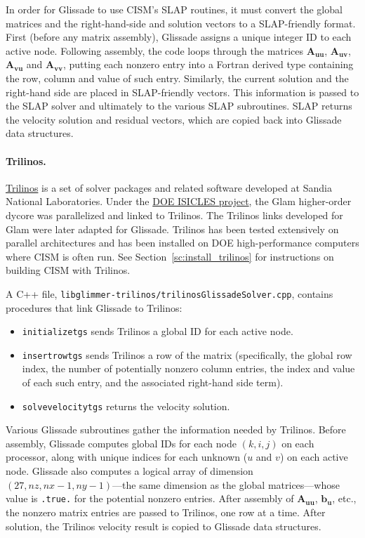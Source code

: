 {In order for Glissade to use CISM's SLAP routines, it must convert the global matrices and the 
right-hand-side and solution vectors to a SLAP-friendly format. First (before any matrix assembly),
Glissade assigns a unique integer ID to each active node.  Following assembly, the code loops through the matrices
$\mathbf{A_{uu}}$, $\mathbf{A_{uv}}$, $\mathbf{A_{vu}}$ and $\mathbf{A_{vv}}$, putting each nonzero entry into a Fortran derived type containing
the row, column and value of such entry.  Similarly, the current solution and the right-hand side are placed
in SLAP-friendly vectors. This information is passed to the SLAP solver
and ultimately to the various SLAP subroutines.  SLAP returns the velocity solution
and residual vectors, which are copied back into Glissade data structures.

\paragraph{Trilinos.}

\href{http://trilinos.org}{Trilinos} is a set of solver packages and related software developed at 
Sandia National Laboratories. Under the 
\href{http://www.csm.ornl.gov/ISICLES/}{DOE ISICLES project},
the Glam higher-order dycore was parallelized and linked to Trilinos.  The Trilinos links
developed for Glam were later adapted for Glissade.  Trilinos has been tested extensively on
parallel architectures and has been installed on DOE high-performance computers where 
CISM is often run.
See Section~\ref{sc:install_trilinos} for instructions on building CISM with Trilinos.

A C++ file, \texttt{libglimmer-trilinos/trilinosGlissadeSolver.cpp}, contains procedures that
link Glissade to Trilinos:

\begin{itemize}
\item \texttt{initializetgs} sends Trilinos a global ID for each active node.
\item \texttt{insertrowtgs} sends Trilinos a row of the matrix (specifically, the global row index, the number of
potentially nonzero column entries, the index and value of each such entry, and the associated right-hand side term).
\item \texttt{solvevelocitytgs} returns the velocity solution.
\end{itemize}

Various Glissade subroutines gather the information needed by Trilinos.  Before assembly, Glissade computes
global IDs for each node $(k,i,j)$ on each processor, along with unique indices for each unknown ($u$ and $v$)
on each active node.  Glissade also computes a logical array of dimension $(27,nz,nx-1,ny-1)$---the same dimension
as the global matrices---whose value is \texttt{.true.} for the potential nonzero entries.
After assembly of $\mathbf{A_{uu}}$, $\mathbf{b_u}$, etc., the nonzero matrix entries are passed to Trilinos, one row at a time.
After solution, the Trilinos velocity result is copied to Glissade data structures.

}
